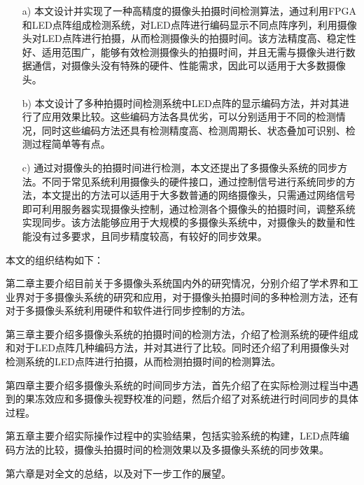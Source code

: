 \begin{itemize}

\item[a)]本文设计并实现了一种高精度的摄像头拍摄时间检测算法，通过利用FPGA和LED点阵组成检测系统，对LED点阵进行编码显示不同点阵序列，利用摄像头对LED点阵进行拍摄，从而检测摄像头的拍摄时间。该方法精度高、稳定性好、适用范围广，能够有效检测摄像头的拍摄时间，并且无需与摄像头进行数据通信，对摄像头没有特殊的硬件、性能需求，因此可以适用于大多数摄像头。

\item[b)]本文设计了多种拍摄时间检测系统中LED点阵的显示编码方法，并对其进行了应用效果比较。这些编码方法各具优劣，可以分别适用于不同的检测情况，同时这些编码方法还具有检测精度高、检测周期长、状态叠加可识别、检测过程简单等有点。

\item[c)]通过对摄像头的拍摄时间进行检测，本文还提出了多摄像头系统的同步方法。不同于常见系统利用摄像头的硬件接口，通过控制信号进行系统同步的方法，本文提出的方法可以适用于大多数普通的网络摄像头，只需通过网络信号即可利用服务器实现摄像头控制，通过检测各个摄像头的拍摄时间，调整系统实现同步。该方法能够应用于大规模的多摄像头系统中，对摄像头的数量和性能没有过多要求，且同步精度较高，有较好的同步效果。

\end{itemize}

本文的组织结构如下：

第二章主要介绍目前关于多摄像头系统国内外的研究情况，分别介绍了学术界和工业界对于多摄像头系统的研究和应用，对于摄像头拍摄时间的多种检测方法，还有对于多摄像头系统利用硬件和软件进行同步控制的方法。

第三章主要介绍多摄像头系统的拍摄时间的检测方法，介绍了检测系统的硬件组成和对于LED点阵几种编码方法，并对其进行了比较。同时还介绍了利用摄像头对检测系统的LED点阵进行拍摄，从而检测拍摄时间的检测算法。

第四章主要介绍多摄像头系统的时间同步方法，首先介绍了在实际检测过程当中遇到的果冻效应和多摄像头视野校准的问题，然后介绍了对系统进行时间同步的具体过程。

第五章主要介绍实际操作过程中的实验结果，包括实验系统的构建，LED点阵编码方法的比较，摄像头拍摄时间的检测效果以及多摄像头系统的同步效果。

第六章是对全文的总结，以及对下一步工作的展望。




































